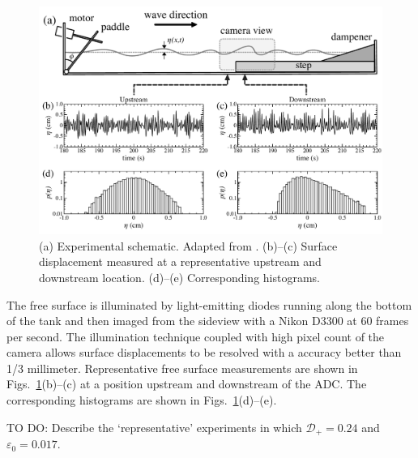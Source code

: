 \documentclass[11pt]{article}
\newcommand{\eps}{\varepsilon}
\newcommand{\drat}{\mathcal{D}}
\newcommand{\dratdn}{\drat_+}
\newcommand{\epsup}{\eps_0}
\begin{document}
\begin{figure}%
\begin{center}
\includegraphics[width = 0.85 \linewidth]{Figs/ExpDiagStats.pdf}
\caption{
(a) Experimental schematic. Adapted from \cite{bolles2019anomalous}.
(b)--(c) Surface displacement measured at a representative upstream and downstream location. (d)--(e) Corresponding histograms.
}
\label{ExpDiagStats}
\end{center}
\end{figure}
 
	The free surface is illuminated by light-emitting diodes running along the bottom of the tank and then imaged from the sideview with a Nikon D3300 at 60 frames per second. The illumination technique coupled with high pixel count of the camera allows surface displacements to be resolved with a accuracy better than 1/3 millimeter. Representative free surface measurements are shown in Figs.~\ref{ExpDiagStats}(b)--(c) at a position upstream and downstream of the ADC. The corresponding histograms are shown in Figs.~\ref{ExpDiagStats}(d)--(e).


TO DO: Describe the `representative' experiments in which $\dratdn = 0.24$ and $\epsup = 0.017$.
\end{document}
